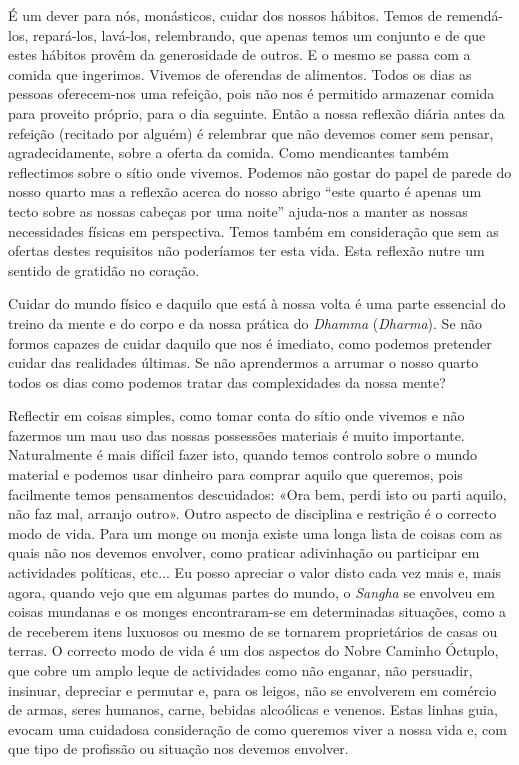 É um dever para nós, monásticos, cuidar dos nossos hábitos. Temos de
remendá-los, repará-los, lavá-los, relembrando, que apenas temos um
conjunto e de que estes hábitos provêm da generosidade de outros. E o
mesmo se passa com a comida que ingerimos. Vivemos de oferendas de
alimentos. Todos os dias as pessoas oferecem-nos uma refeição, pois não
nos é permitido armazenar comida para proveito próprio, para o dia
seguinte. Então a nossa reflexão diária antes da refeição (recitado por
alguém) é relembrar que não devemos comer sem pensar, agradecidamente,
sobre a oferta da comida. Como mendicantes também reflectimos sobre o
sítio onde vivemos. Podemos não gostar do papel de parede do nosso
quarto mas a reflexão acerca do nosso abrigo ``este quarto é apenas um
tecto sobre as nossas cabeças por uma noite'' ajuda-nos a manter as
nossas necessidades físicas em perspectiva. Temos também em consideração
que sem as ofertas destes requisitos não poderíamos ter esta vida. Esta
reflexão nutre um sentido de gratidão no coração.

Cuidar do mundo físico e daquilo que está à nossa volta é uma parte
essencial do treino da mente e do corpo e da nossa prática do
\emph{Dhamma} (\emph{Dharma}). Se não formos capazes de cuidar daquilo
que nos é imediato, como podemos pretender cuidar das realidades
últimas. Se não aprendermos a arrumar o nosso quarto todos os dias como
podemos tratar das complexidades da nossa mente?

Reflectir em coisas simples, como tomar conta do sítio onde vivemos e
não fazermos um mau uso das nossas possessões materiais é muito
importante. Naturalmente é mais difícil fazer isto, quando temos
controlo sobre o mundo material e podemos usar dinheiro para comprar
aquilo que queremos, pois facilmente temos pensamentos descuidados: «Ora
bem, perdi isto ou parti aquilo, não faz mal, arranjo outro». Outro
aspecto de disciplina e restrição é o correcto modo de vida. Para um
monge ou monja existe uma longa lista de coisas com as quais não nos
devemos envolver, como praticar adivinhação ou participar em actividades
políticas, etc... Eu posso apreciar o valor disto cada vez mais e, mais
agora, quando vejo que em algumas partes do mundo, o \emph{Sangha} se
envolveu em coisas mundanas e os monges encontraram-se em determinadas
situações, como a de receberem itens luxuosos ou mesmo de se tornarem
proprietários de casas ou terras. O correcto modo de vida é um dos
aspectos do Nobre Caminho Óctuplo, que cobre um amplo leque de
actividades como não enganar, não persuadir, insinuar, depreciar e
permutar e, para os leigos, não se envolverem em comércio de armas,
seres humanos, carne, bebidas alcoólicas e venenos. Estas linhas guia,
evocam uma cuidadosa consideração de como queremos viver a nossa vida e,
com que tipo de profissão ou situação nos devemos envolver.


